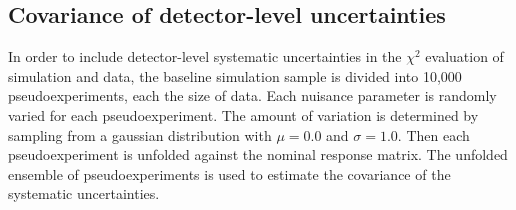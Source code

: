 \subsection{Covariance of detector-level uncertainties}
In order to include detector-level systematic uncertainties in the $\chi^2$ evaluation of simulation and data, the baseline simulation sample is divided into 10,000 pseudoexperiments, each the size of data. Each nuisance parameter is randomly varied for each pseudoexperiment. The amount of variation is determined by sampling from a gaussian distribution with $\mu=0.0$ and $\sigma=1.0$. Then each pseudoexperiment is unfolded against the nominal response matrix. The unfolded ensemble of pseudoexperiments is used to estimate the covariance of the systematic uncertainties.
